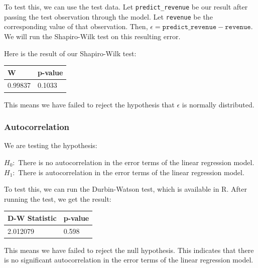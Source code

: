 To test this, we can use the test data. Let \texttt{predict\_revenue} be our result after passing the test observation through the model. Let \texttt{revenue} be the corresponding value of that observation. Then, \( \epsilon = \texttt{predict\_revenue} - \texttt{revenue} \). We will run the Shapiro-Wilk test on this resulting error.

Here is the result of our Shapiro-Wilk test:

\begin{table}[H]
\centering
{}
\begin{tabular}{ll}
  \hline
                W             & p-value    \\
  \hline
        0.99837   & 0.1033   \\
  \hline
\end{tabular}
\label{tab:shapiro}
\end{table}

This means we have failed to reject the hypothesis that \( \epsilon \) is normally distributed.

\subsubsection{Autocorrelation}

We are testing the hypothesis:

\begin{center}
    \( H_0: \) There is no autocorrelation in the error terms of the linear regression model. \\
    \( H_1: \) There is autocorrelation in the error terms of the linear regression model.
\end{center}

To test this, we can run the Durbin-Watson test, which is available in R. After running the test, we get the result:

\begin{table}[H]
\centering
{}
\begin{tabular}{ll}
  \hline
                D-W Statistic & p-value    \\
  \hline
        2.012079           & 0.598   \\
  \hline
\end{tabular}
\label{tab:durbin-watson}
\end{table}

This means we have failed to reject the null hypothesis. This indicates that there is no significant autocorrelation in the error terms of the linear regression model.

